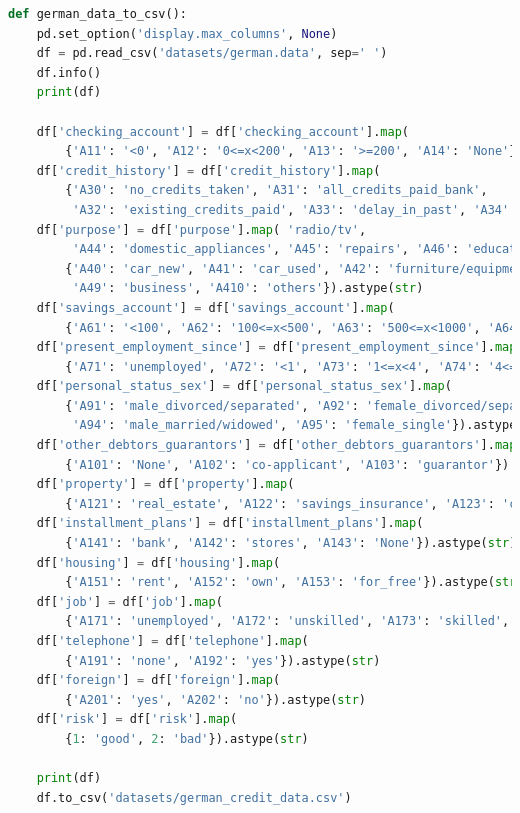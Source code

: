 \documentclass[portugues]{ic-tese}
\begin{document}
\begin{lstlisting}[language=Python, caption=Transformações do conjunto de dados \textit{German Credit Dataset},label=cod:DataEngTransform]
def german_data_to_csv():
    pd.set_option('display.max_columns', None)
    df = pd.read_csv('datasets/german.data', sep=' ')
    df.info()
    print(df)

    df['checking_account'] = df['checking_account'].map(
        {'A11': '<0', 'A12': '0<=x<200', 'A13': '>=200', 'A14': 'None'}).astype(str)
    df['credit_history'] = df['credit_history'].map(
        {'A30': 'no_credits_taken', 'A31': 'all_credits_paid_bank',
         'A32': 'existing_credits_paid', 'A33': 'delay_in_past', 'A34': 'critical'}).astype(str)
    df['purpose'] = df['purpose'].map( 'radio/tv',
         'A44': 'domestic_appliances', 'A45': 'repairs', 'A46': 'education', 'A47':
        {'A40': 'car_new', 'A41': 'car_used', 'A42': 'furniture/equipment', 'A43': 'vacation', 'A48': 'retraining',
         'A49': 'business', 'A410': 'others'}).astype(str)
    df['savings_account'] = df['savings_account'].map(
        {'A61': '<100', 'A62': '100<=x<500', 'A63': '500<=x<1000', 'A64': '>=1000', 'A65': 'unknown'}).astype(str)
    df['present_employment_since'] = df['present_employment_since'].map(
        {'A71': 'unemployed', 'A72': '<1', 'A73': '1<=x<4', 'A74': '4<=x<7', 'A75': '>=7'}).astype(str)
    df['personal_status_sex'] = df['personal_status_sex'].map(
        {'A91': 'male_divorced/separated', 'A92': 'female_divorced/separated/married', 'A93': 'male_single',
         'A94': 'male_married/widowed', 'A95': 'female_single'}).astype(str)
    df['other_debtors_guarantors'] = df['other_debtors_guarantors'].map(
        {'A101': 'None', 'A102': 'co-applicant', 'A103': 'guarantor'}).astype(str)
    df['property'] = df['property'].map(
        {'A121': 'real_estate', 'A122': 'savings_insurance', 'A123': 'car_other', 'A124': 'unknown'}).astype(str)
    df['installment_plans'] = df['installment_plans'].map(
        {'A141': 'bank', 'A142': 'stores', 'A143': 'None'}).astype(str)
    df['housing'] = df['housing'].map(
        {'A151': 'rent', 'A152': 'own', 'A153': 'for_free'}).astype(str)
    df['job'] = df['job'].map(
        {'A171': 'unemployed', 'A172': 'unskilled', 'A173': 'skilled', 'A174': 'management'}).astype(str)
    df['telephone'] = df['telephone'].map(
        {'A191': 'none', 'A192': 'yes'}).astype(str)
    df['foreign'] = df['foreign'].map(
        {'A201': 'yes', 'A202': 'no'}).astype(str)
    df['risk'] = df['risk'].map(
        {1: 'good', 2: 'bad'}).astype(str)

    print(df)
    df.to_csv('datasets/german_credit_data.csv')
\end{lstlisting}
\end{document}
